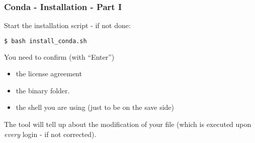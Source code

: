 \begin{frame}[fragile]
  \frametitle{Conda - Installation - Part I}
  Start the installation script - if not done:
  \begin{lstlisting}[language=Bash, style=Shell]
$ bash install_conda.sh
  \end{lstlisting}
  You need to confirm (with ``Enter'')
  \begin{itemize}[<+->]
  	\item the license agreement
	\item the binary folder.
	\item the shell you are using (just to be on the save side)
  \end{itemize} 
  The tool will tell up about the modification of your  file (which is executed upon \emph{every} login - if not corrected).
\end{frame}
	
